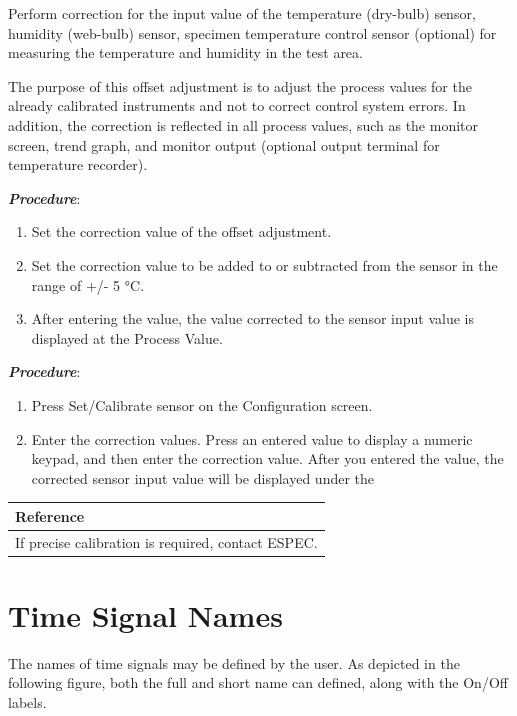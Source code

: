 Perform correction for the input value of the temperature (dry-bulb)
sensor, humidity (web-bulb) sensor, specimen temperature control sensor
(optional) for measuring the temperature and humidity in the test area.

The purpose of this offset adjustment is to adjust the process values
for the already calibrated instruments and not to correct control system
errors. In addition, the correction is reflected in all process values,
such as the monitor screen, trend graph, and monitor output (optional
output terminal for temperature recorder).

\textbf{\emph{Procedure}}:

\begin{enumerate}
\def\labelenumi{\arabic{enumi}.}
\tightlist
\item
  Set the correction value of the offset adjustment.
\item
  Set the correction value to be added to or subtracted from the sensor
  in the range of +/- 5 °C.
\item
  After entering the value, the value corrected to the sensor input
  value is displayed at the Process Value.
\end{enumerate}

\textbf{\emph{Procedure}}:

\begin{enumerate}
\def\labelenumi{\arabic{enumi}.}
\tightlist
\item
  Press Set/Calibrate sensor on the Configuration screen.
\item
  Enter the correction values. Press an entered value to display a
  numeric keypad, and then enter the correction value. After you entered
  the value, the corrected sensor input value will be displayed under
  the
\end{enumerate}

\begin{longtable}[]{@{}l@{}}
\toprule
\textbf{Reference}\tabularnewline
\midrule
\endhead
If precise calibration is required, contact ESPEC.\tabularnewline
\bottomrule
\end{longtable}


\section{Time Signal Names}

The names of time signals may be defined by the user. As depicted in the
following figure, both the full and short name can defined, along with
the On/Off labels.

